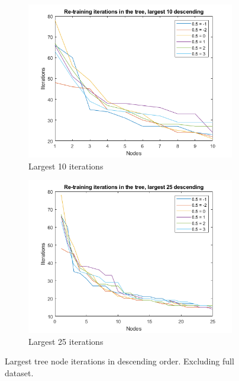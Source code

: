 \begin{figure}
    \centering
    \begin{subfigure}[b]{.49\textwidth}
        \centering
        \includegraphics[width=\textwidth]{figures/treeretrainiter10.png}
        \caption{Largest 10 iterations}
        \label{sfig:tree:treeiter10}
    \end{subfigure}
    \hfill
    \begin{subfigure}[b]{.49\textwidth}
        \centering
        \includegraphics[width=\textwidth]{figures/treeretrainiter25.png}
        \caption{Largest 25 iterations}
        \label{sfig:tree:treeiter25}
    \end{subfigure}
    \caption{Largest tree node iterations in descending order. Excluding full dataset.}
    \label{fig:tree:treeiter}
\end{figure}


